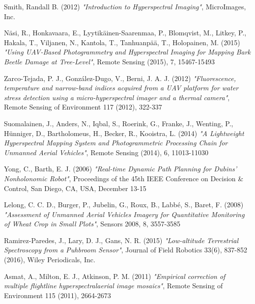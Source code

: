 \begin{thebibliography}{25}
	
	Smith, Randall B. (2012)
	\emph{"Introduction to Hyperspectral Imaging"},
	MicroImages, Inc.
	
	Näsi, R., Honkavaara, E., Lyytikäinen-Saarenmaa, P., Blomqvist, M., Litkey, P., Hakala, T., Viljanen, N., Kantola, T., Tanhuanpää, T., Holopainen, M. (2015)
	\emph{"Using UAV-Based Photogrammetry and Hyperspectral Imaging for Mapping Bark Beetle Damage at Tree-Level"},
	Remote Sensing (2015), 7, 15467-15493
	
	Zarco-Tejada, P. J., González-Dugo, V., Berni, J. A. J. (2012)
	\emph{"Fluorescence, temperature and narrow-band indices acquired from a UAV platform for water stress detection using a micro-hyperspectral imager and a thermal camera"},
	Remote Sensing of Environment 117 (2012), 322-337
	
	Suomalainen, J., Anders, N., Iqbal, S., Roerink, G., Franke, J., Wenting, P., Hünniger, D., Bartholomeus, H., Becker, R., Kooistra, L. (2014)
	\emph{"A Lightweight Hyperspectral Mapping System and Photogrammetric Processing Chain for Unmanned Aerial Vehicles"},
	Remote Sensing (2014), 6, 11013-11030
	
	
	Yong, C., Barth, E. J. (2006)
	\emph{"Real-time Dynamic Path Planning for Dubins' Nonholonomic Robot"},
	Proceedings of the 45th IEEE Conference on Decision \& Control, San Diego, CA, USA, December 13-15
	
	
	Lelong, C. C. D., Burger, P., Jubelin, G., Roux, B., Labbé, S., Baret, F. (2008)
	\emph{"Assessment of Unmanned Aerial Vehicles Imagery for Quantitative Monitoring of Wheat Crop in Small Plots"},
	Sensors 2008, 8, 3557-3585
	
	Ramirez-Paredes, J., Lary, D. J., Gans, N. R. (2015)
	\emph{"Low-altitude Terrestrial Spectroscopy from a Puhbroom Sensor"},
	Journal of Field Robotics 33(6), 837-852 (2016), Wiley Periodicals, Inc.
	
	Asmat, A., Milton, E. J., Atkinson, P. M. (2011)
	\emph{"Empirical correction of multiple flightline hyperspectralaerial image mosaics"},
	Remote Sensing of Environment 115 (2011), 2664-2673
	
	
\end{thebibliography}